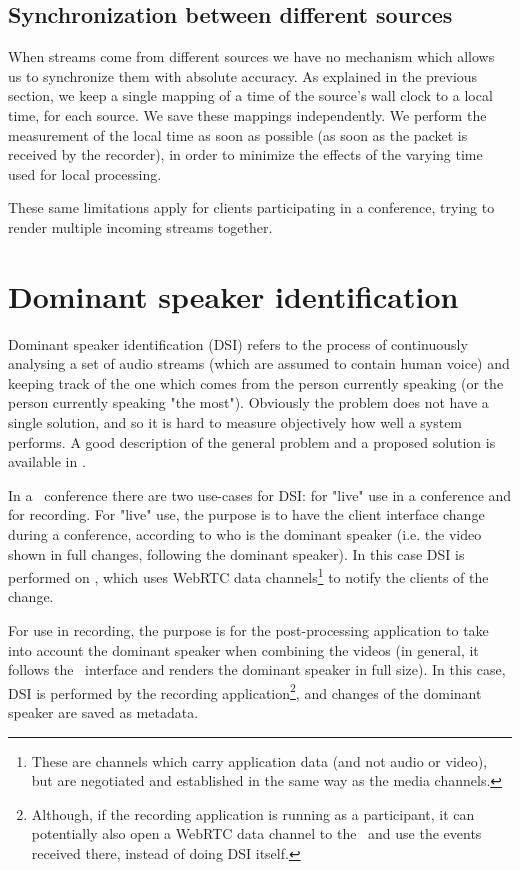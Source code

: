 \documentclass[twoside,openright,a4paper,12pt,english]{article}
\begin{document}
\subsection{Synchronization between different sources}
When streams come from different sources we have no mechanism which allows us
to synchronize them with absolute accuracy. As explained in the previous section, we keep a single
mapping of a time of the source's wall clock to a local time, for each source.
We save these mappings independently. We perform the measurement of the local
time as soon as possible (as soon as the packet is received by the recorder),
in order to minimize the effects of the varying time used for local processing.

These same limitations apply for clients participating in a conference, trying to
render multiple incoming streams together.




\section{Dominant speaker identification}
\label{dsd}
Dominant speaker identification (DSI) refers to the process of continuously analysing a set of audio streams
(which are assumed to contain human voice) and keeping track of the one which
comes from the person currently speaking (or the person currently speaking "the
most"). Obviously the problem does not have a single solution, and so it is hard
to measure objectively how well a system performs. A good description of the
general problem and a proposed solution is available in \cite{volfin2012}. 

In a \jm\ conference there are two use-cases for DSI: for "live" use in a
conference and for recording. 
For "live" use, the purpose is to have the client interface change during a
conference, according to who is the dominant speaker (i.e. the video shown in
full changes, following the dominant speaker). In this case DSI is performed
on \jvb, which uses WebRTC data channels\footnote{These are channels which
carry application data (and not audio or video), but are negotiated and
established in the same way as the media channels.}
to notify the clients of the change.

For use in recording, the purpose is for the post-processing application to
take into account the dominant speaker when combining the videos (in general,
it follows the \jm\ interface and renders the dominant speaker in full size).
In this case, DSI is performed by the recording application\footnote{Although,
if the recording application is running as a participant, it can potentially
also open a WebRTC data channel to the \jvb\ and use the events received there,
instead of doing DSI itself.}, and changes of
the dominant speaker are saved as metadata.
\end{document}
